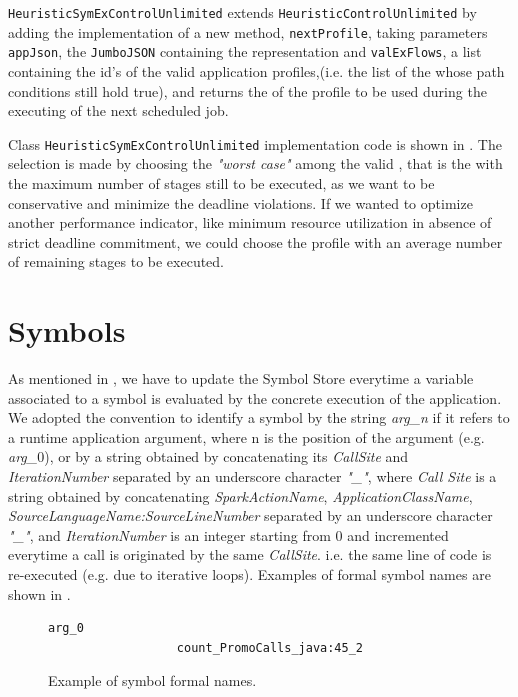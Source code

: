 \texttt{HeuristicSymExControlUnlimited} extends \texttt{HeuristicControlUnlimited} by adding the implementation of a new method, \texttt{nextProfile}, taking parameters \texttt{appJson}, the \texttt{JumboJSON} containing the \model representation and \texttt{valExFlows}, a list containing the id's of the valid application profiles,(i.e. the list of the \plans whose path conditions still hold true), and returns the \plan of the profile to be used during the executing of the next scheduled job.

Class \texttt{HeuristicSymExControlUnlimited} implementation code is shown in . The \plan selection is made by choosing the \textit{"worst case"} among the valid \plans, that is the \plan with the maximum number of stages still to be executed, as we want to be conservative and minimize the deadline violations. If we wanted to optimize another performance indicator, like minimum  resource utilization in absence of strict deadline commitment, we could choose the profile with an average number of remaining stages to be executed. 
  
\section{Symbols}\label{sec:guardevaluator}
As mentioned in , we have to update the Symbol Store everytime a variable associated to a symbol is evaluated by the concrete execution of the application. We adopted the convention to identify a symbol by the string \textit{arg\_n} if it refers to a runtime application argument, where n is the position of the argument (e.g. \textit{arg\_$0$}), or by a string obtained by concatenating its \textit{CallSite} and \textit{IterationNumber} separated by an underscore character \textit{"\_"}, where \textit{Call Site} is a string obtained by concatenating \textit{SparkActionName}, \textit{ApplicationClassName}, \textit{SourceLanguageName:SourceLineNumber} separated by an underscore character \textit{"\_"}, and  \textit{IterationNumber} is an integer starting from $0$ and incremented everytime a call is originated by the same \textit{CallSite}. i.e. the same line of code is re-executed (e.g. due to iterative loops). Examples of formal symbol names are shown in .
\begin{figure}[tbhp]
	\centering
	\begin{lstlisting}[basicstyle=\ttfamily\scriptsize]
		          arg_0
		          count_PromoCalls_java:45_2
	\end{lstlisting}
	\caption{Example of symbol formal names.}
	\label{fig:symbol_name}
\end{figure}

